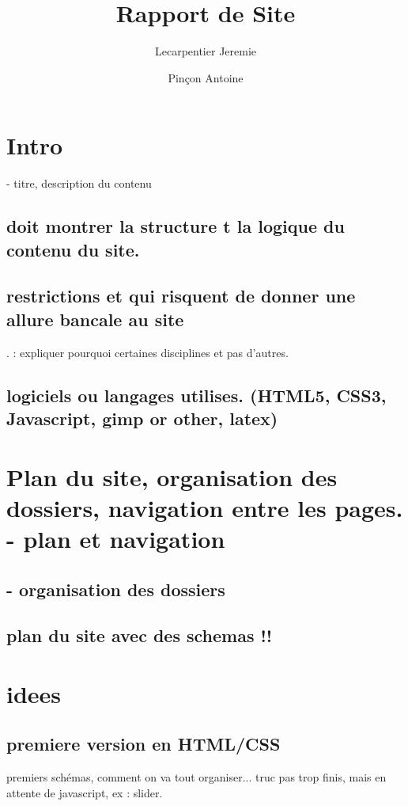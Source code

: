 \documentclass{scrartcl}
\begin{document}
\title{Rapport de Site}
\author{Lecarpentier Jeremie
\and Pinçon Antoine}
\maketitle


\tableofcontents
\listoftables
\listoffigures



\section{Intro}


- titre, description du contenu
\subsection{ doit montrer la structure t la logique du contenu du site.}
\subsection{restrictions et qui risquent de donner une allure bancale au site}
. : expliquer pourquoi certaines disciplines et pas d’autres.
\subsection{logiciels ou langages utilises. (HTML5, CSS3, Javascript, gimp or other, latex)}


\section{Plan du site, organisation des dossiers, navigation entre les pages. - plan et navigation}
\subsection{- organisation des dossiers}
\subsection{ plan du site avec des schemas !!}


\section{idees}
\subsection{premiere version en HTML/CSS}
premiers schémas, comment on va tout organiser...
truc pas trop finis, mais en attente de javascript, ex : slider.
\end{document}
